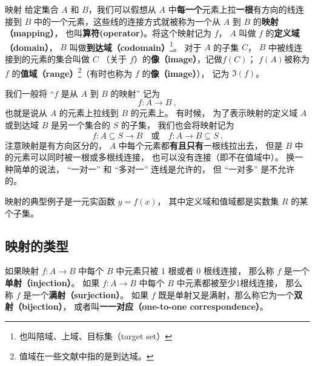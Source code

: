 

\begin{definition}{映射}
给定集合 $A$ 和 $B$，我们可以假想从 $A$ 中\textbf{每一个}元素上拉\textbf{一根}有方向的线连接到 $B$ 中的一个元素，这些线的连接方式就被称为一个从 $A$ 到 $B$ 的\textbf{映射（mapping）}， 也叫\textbf{算符(operator)}。将这个映射记为 $f$， $A$ 叫做 $f$ 的\textbf{定义域（domain）}， $B$ 叫做\textbf{到达域（codomain）}\footnote{也叫陪域、上域、目标集（target set）}。 对于 $A$ 的子集 $C$， $B$ 中被线连接到的元素的集合叫做 $C$ （关于 $f$）的\textbf{像（image）}，记做$f(C)$； $f(A)$被称为 $f$ 的\textbf{值域（range）}\footnote{值域在一些文献中指的是到达域。}（有时也称为 $f$ 的\textbf{像（image）}）， 记为 $\Im(f)$。
\end{definition}

我们一般将 “$f$ 是从 $A$ 到 $B$ 的映射” 记为
\begin{equation}
f: A \to B~,
\end{equation}
也就是说从 $A$ 的元素上拉线到 $B$ 的元素上。 有时候， 为了表示映射的定义域 $A$ 或到达域 $B$ 是另一个集合的 $S$ 的子集， 我们也会将映射记为
\begin{equation}
f: A\subseteq S \to B \quad\text{或}\quad f: A \to B \subseteq S~.
\end{equation}
注意映射是有方向区分的， $A$ 中每个元素都\textbf{有且只有}一根线拉出去， 但是 $B$ 中的元素可以同时被一根或多根线连接， 也可以没有连接（即不在值域中）。 换一种简单的说法， “一对一” 和 “多对一” 连线是允许的， 但 “一对多” 是不允许的。

\begin{example}{}
映射的典型例子是一元实函数 $y = f(x)$， 其中定义域和值域都是实数集 $R$ 的某个子集。
\end{example}

\subsection{映射的类型}
\begin{definition}{}\label{def_map_1}
如果映射 $f: A  \to B$ 中每个 $B$ 中元素只被 1 根或者 0 根线连接， 那么称 $f$ 是一个\textbf{单射（injection）}。 如果 $f: A \to B$ 中每个 $B$ 中元素都被至少1根线连接， 那么称 $f$ 是一个\textbf{满射（surjection）}。 如果 $f$ 既是单射又是满射，那么称它为一个\textbf{双射（bijection）}， 或者叫\textbf{一一对应（one-to-one correspondence）}。
\end{definition}

